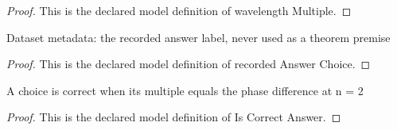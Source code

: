\begin{proof}
  This is the declared model definition of wavelength Multiple.
\end{proof}
\begin{definition}
  \label{def:physics:phyx-mini-0089:phyxminiproblems-problemphyxmini0089-recordedanswerchoice}
  Dataset metadata: the recorded answer label, never used as a theorem premise
\end{definition}
\begin{proof}
  This is the declared model definition of recorded Answer Choice.
\end{proof}
\begin{definition}
  \label{def:physics:phyx-mini-0089:phyxminiproblems-problemphyxmini0089-iscorrectanswer}
  A choice is correct when its multiple equals the phase difference at n = 2
\end{definition}
\begin{proof}
  This is the declared model definition of Is Correct Answer.
\end{proof}
